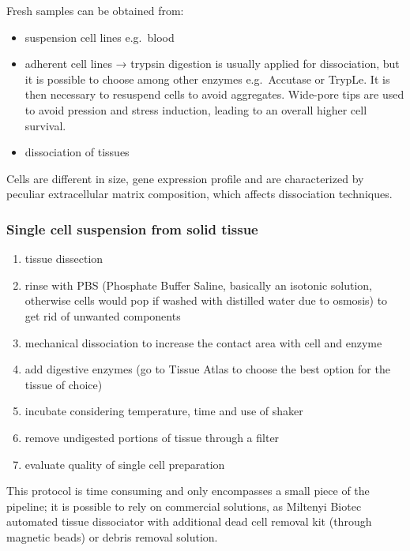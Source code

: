 Fresh samples can be obtained from:

\begin{itemize}
\tightlist
\item
  suspension cell lines e.g.~blood
\item
  adherent cell lines → trypsin digestion is usually applied for
  dissociation, but it is possible to choose among other enzymes
  e.g.~Accutase or TrypLe. It is then necessary to resuspend cells to
  avoid aggregates. Wide-pore tips are used to avoid pression and stress
  induction, leading to an overall higher cell survival.
\item
  dissociation of tissues
\end{itemize}

Cells are different in size, gene expression profile and are
characterized by peculiar extracellular matrix composition, which
affects dissociation techniques.

\hypertarget{single-cell-suspension-from-solid-tissue}{%
\subsubsection{Single cell suspension from solid
tissue}\label{single-cell-suspension-from-solid-tissue}}

\begin{enumerate}
\def\labelenumi{\arabic{enumi}.}
\tightlist
\item
  tissue dissection
\item
  rinse with PBS (Phosphate Buffer Saline, basically an isotonic solution, 
  otherwise cells would pop if washed with distilled water due to osmosis) 
  to get rid of unwanted components
\item
  mechanical dissociation to increase the contact area with cell and
  enzyme
\item
  add digestive enzymes (go to Tissue Atlas to choose the best option
  for the tissue of choice)
\item
  incubate considering temperature, time and use of shaker
\item
  remove undigested portions of tissue through a filter
\item
  evaluate quality of single cell preparation
\end{enumerate}

This protocol is time consuming and only encompasses a small piece of
the pipeline; it is possible to rely on commercial solutions, as
Miltenyi Biotec automated tissue dissociator with additional dead cell
removal kit (through magnetic beads) or debris removal solution.

